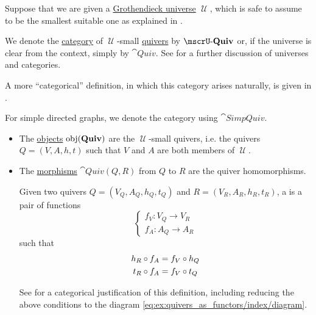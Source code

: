 \begin{definition}\label{def:category_of_small_quivers}
  Suppose that we are given a \hyperref[def:grothendieck_universe]{Grothendieck universe} \( \mscrU \), which is safe to assume to be the smallest suitable one as explained in .

  We denote the \hyperref[def:category]{category} of \( \mscrU \)-small \hyperref[def:hypergraph]{quivers} by \( \ucat{Quiv} \) or, if the universe is clear from the context, simply by \( \cat{Quiv} \). See  for a further discussion of universes and categories.

  A more \enquote{categorical} definition, in which this category arises naturally, is given in .

  For simple directed graphs, we denote the category using \( \cat{SimpQuiv} \).

  \begin{itemize}
    \item The \hyperref[def:category/objects]{objects} \( \operatorname{obj}(\operatorname{\mathbf{Quiv}}) \) are the \( \mscrU \)-small quivers, i.e. the quivers \( Q = (V, A, h, t) \) such that \( V \) and \( A \) are both members of \( \mscrU \).

    \item The \hyperref[def:category/morphisms]{morphisms} \( \cat{Quiv}(Q, R) \) from \( Q \) to \( R \) are the quiver homomorphisms.

    Given two quivers \( Q = (V_Q, A_Q, h_Q, t_Q) \) and \( R = (V_R, A_R, h_R, t_R) \), a  is a pair of functions
    \begin{equation}\label{eq:def:category_of_small_quivers/homomorphism}
      \begin{cases}
        f_V: V_Q \to V_R \\
        f_A: A_Q \to A_R
      \end{cases}
    \end{equation}
    such that
    \begin{align}
      h_R \bincirc f_A &= f_V \bincirc h_Q \label{eq:def:category_of_small_quivers/homomorphism/head} \\
      t_R \bincirc f_A &= f_V \bincirc t_Q \label{eq:def:category_of_small_quivers/homomorphism/tail}
    \end{align}

    See  for a categorical justification of this definition, including reducing the above conditions to the diagram \eqref{eq:ex:quivers_as_functors/index/diagram}.


\end{itemize}
\end{definition}
